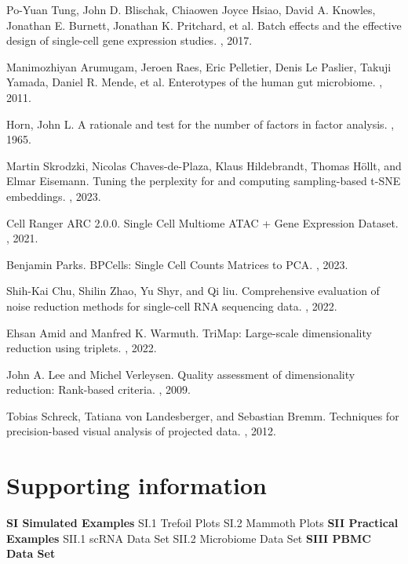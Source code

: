 \documentclass{article}
\begin{document}
\begin{thebibliography}{10}
 Po-Yuan Tung, John D. Blischak, Chiaowen Joyce Hsiao, David A. Knowles, Jonathan E. Burnett, Jonathan K. Pritchard, et al.
 \newblock Batch effects and the effective design of single-cell gene expression studies.
 , 2017.

Manimozhiyan Arumugam, Jeroen Raes, Eric Pelletier, Denis Le Paslier, Takuji Yamada, Daniel R. Mende, et al.
\newblock Enterotypes of the human gut microbiome.
, 2011.

Horn, John L.
\newblock A rationale and test for the number of factors in factor analysis.
, 1965.

Martin Skrodzki, Nicolas Chaves-de-Plaza, Klaus Hildebrandt, Thomas H\"ollt, and Elmar Eisemann.
\newblock Tuning the perplexity for and computing sampling-based t-SNE embeddings.
, 2023.

Cell Ranger ARC 2.0.0.
\newblock Single Cell Multiome ATAC + Gene Expression Dataset.
, 2021.

Benjamin Parks.
\newblock BPCells: Single Cell Counts Matrices to PCA.
, 2023.

Shih-Kai Chu, Shilin Zhao, Yu Shyr, and Qi liu.
\newblock Comprehensive evaluation of noise reduction methods for single-cell RNA sequencing data.
, 2022.

Ehsan Amid and Manfred K. Warmuth. 
\newblock TriMap: Large-scale dimensionality reduction using triplets. 
, 2022.

John A. Lee and Michel Verleysen.
\newblock Quality assessment of dimensionality reduction: Rank-based criteria.
, 2009.

Tobias Schreck, Tatiana von Landesberger, and Sebastian Bremm.
\newblock Techniques for precision-based visual analysis of projected data.
, 2012.

\end{thebibliography}

\section{Supporting information}
\textbf{SI Simulated Examples}
\newline SI.1 Trefoil Plots
\newline SI.2 Mammoth Plots
\newline\textbf{SII Practical Examples}
\newline SII.1 scRNA Data Set
\newline SII.2 Microbiome Data Set
\newline\textbf{SIII PBMC Data Set}
\end{document}
